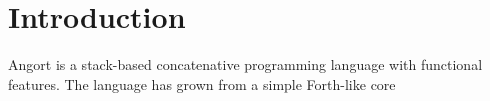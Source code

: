 \section{Introduction}
Angort is a stack-based concatenative programming language with
functional features. The language has grown from a simple Forth-like
core
